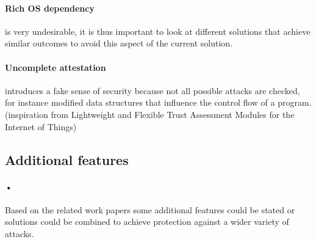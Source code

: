 \documentclass{report}
\begin{document}
\paragraph*{Rich OS dependency}
is very undesirable, it is thus important to look at different solutions that achieve similar outcomes to avoid this aspect of the current solution.

\paragraph*{Uncomplete attestation}
introduces a fake sense of security because not all possible attacks are checked, for instance modified data structures that influence the control flow of a program. (inspiration from Lightweight and Flexible Trust Assessment Modules for the Internet of Things)

\subsection*{Additional features}

\paragraph*{•}
Based on the related work papers some additional features could be stated or solutions could be combined to achieve protection against a wider variety of attacks.
\end{document}
